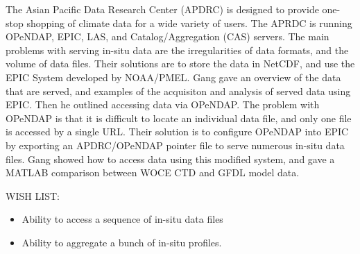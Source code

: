 The Asian Pacific Data Research Center (APDRC) is designed to provide
one-stop shopping of climate data for a wide variety of users.  The
APRDC is running OPeNDAP, EPIC, LAS, and Catalog/Aggregation (CAS) servers.
The main problems with serving in-situ data are the irregularities
of data formats, and the volume of data files.  Their solutions are
to store the data in NetCDF, and use the EPIC System developed by
NOAA/PMEL.  Gang gave an overview of the data that are served, and
examples of the acquisiton and analysis of served data using EPIC.
Then he outlined accessing data via OPeNDAP.  The problem with OPeNDAP
is that it is difficult to locate an individual data file, and only
one file is accessed by a single URL.  Their solution is to configure
OPeNDAP into EPIC by exporting an APDRC/OPeNDAP pointer file to
serve numerous in-situ data files.  Gang showed how to access data using
this modified system, and gave a MATLAB comparison between WOCE CTD
and GFDL model data.  

WISH LIST:  

\begin{itemize}
\item  Ability to access a sequence of in-situ data files
\item  Ability to aggregate a bunch of in-situ profiles.
\end{itemize}


%
%
%
%

